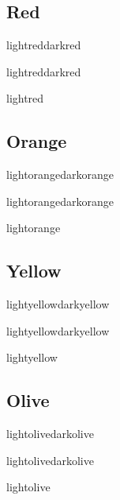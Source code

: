 \documentclass[10pt,twoside,twocolumn]{article}
\begin{document}
\selectfont %



\subsection{Red}
\begin{quotebox}{lightred}{darkred}
    \lipsum[1][1-4]
\end{quotebox}
\begin{paperbox}{}{lightred}{darkred}
    \lipsum[1][5-9]
\end{paperbox}
\begin{commentbox}{}{lightred}
    \lipsum[2][1-5]
\end{commentbox}

\subsection{Orange}
\begin{quotebox}{lightorange}{darkorange}
    \lipsum[1][1-4]
\end{quotebox}
\begin{paperbox}{}{lightorange}{darkorange}
    \lipsum[1][5-9]
\end{paperbox}
\begin{commentbox}{}{lightorange}
    \lipsum[2][1-5]
\end{commentbox}

\subsection{Yellow}
\begin{quotebox}{lightyellow}{darkyellow}
    \lipsum[1][1-4]
\end{quotebox}
\begin{paperbox}{}{lightyellow}{darkyellow}
    \lipsum[1][5-9]
\end{paperbox}
\begin{commentbox}{}{lightyellow}
    \lipsum[2][1-5]
\end{commentbox}

\subsection{Olive}
\begin{quotebox}{lightolive}{darkolive}
    \lipsum[1][1-4]
\end{quotebox}
\begin{paperbox}{}{lightolive}{darkolive}
    \lipsum[1][5-9]
\end{paperbox}
\begin{commentbox}{}{lightolive}
    \lipsum[2][1-5]
\end{commentbox}
\end{document}
